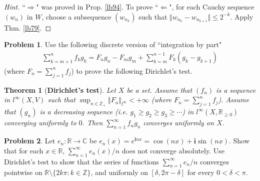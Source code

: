 \documentclass[12pt,b5paper,notitlepage]{article}
\theoremstyle{definition}
\newtheorem{prob}{\color{red}Problem}[section]
\newtheorem{sprob}[prob]{\color{red}$\star$ Problem}
\theoremstyle{plain}
\newtheorem{thm}[df]{Theorem}
\newcommand{\ovl}{\overline}
\newcommand{\im}{\mathbf{i}}
\newcommand{\Cbb}{\mathbb C}
\newcommand{\Zbb}{\mathbb Z}
\newcommand{\Rbb}{\mathbb R}
\numberwithin{equation}{section}
\begin{document}
\begin{proof}[Hint]
``$\Rightarrow$" was proved in Prop. \ref{lb94}. To prove ``$\Leftarrow$", for each Cauchy sequence $(w_n)$ in $W$, choose a subsequence $(w_{n_k})$ such that $\Vert w_{n_k}-w_{n_{k+1}}\Vert\leq 2^{-k}$. Apply Thm. \ref{lb79}.
\end{proof}

\begin{prob}
Use the following discrete version of ``integration by part" 
\begin{align}
\sum_{k=m+1}^n f_kg_k=F_ng_n-F_mg_m+\sum_{k=m}^{n-1}F_k (g_k-g_{k+1})
\end{align}
(where $F_n=\sum_{j=1}^n f_j$) to prove the following Dirichlet's test.
\end{prob}


\begin{thm}[\textbf{Dirichlet's test}]\label{lb481}
Let $X$ be a set. Assume that $(f_n)$ is a sequence in $l^\infty(X,V)$ such that $\sup_{n\in\Zbb_+}\Vert F_n\Vert_{l^\infty}<+\infty$ (where $F_n=\sum_{j=1}^n f_j$). Assume that $(g_n)$ is a decreasing sequence (i.e. $g_1\geq g_2\geq g_3\geq\cdots$) in $l^\infty(X,\Rbb_{\geq0})$ converging uniformly to $0$. Then $\sum_{n=1}^\infty f_ng_n$ converges uniformly on $X$.
\end{thm}


\begin{prob}\label{lb394}
Let $e_n:\Rbb\rightarrow\Cbb$ be $e_n(x)=e^{\im nx}=\cos(nx)+\im\sin(nx)$. Show that for each $x\in\Rbb$, $\sum_{n=1}^\infty e_n(x)/n$ does not converge absolutely. Use Dirichlet's test to show that the series of functions $\sum_{n=1}^\infty e_n/n$ converges pointwise on $\Rbb\setminus\{2k\pi:k\in\Zbb\}$, and uniformly on $[\delta,2\pi-\delta]$ for every $0<\delta<\pi$.
\end{prob}











\begin{comment}

\subsection{Problems and supplementary material}

\begin{sprob}
Consider a power series $\sum a_nz^n$ where $a_n\in\Rbb_{\geq 0}$ for each $n$. Let $R$ be its radius of convergence. Prove that the following are equivalent.
\begin{enumerate}[label=(\arabic*)]
\item $\sum a_n<+\infty$.
\item $\sum a_nz^n$ converges uniformly on $\ovl B_\Cbb(0,R)$ to a continuous function.
\item $\sum a_nz^n$ converges uniformly on $B_\Cbb(0,R)$.
\end{enumerate}
\end{sprob}
\end{comment}
\end{document}
